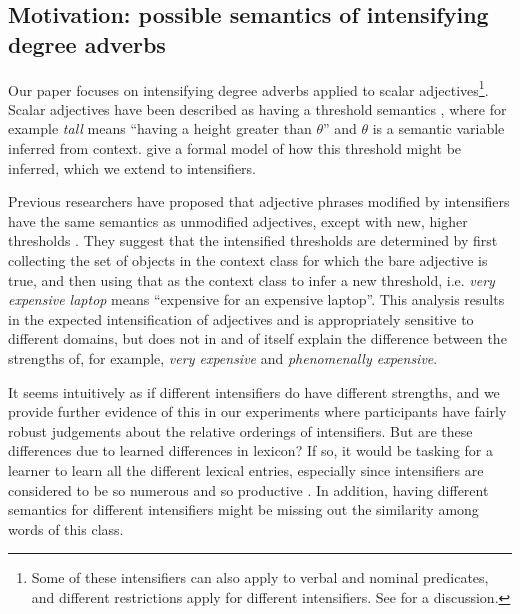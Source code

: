 \documentclass[10pt,letterpaper]{article}
\newcommand{\w}[1]{\emph{#1}}
\begin{document}
\subsection{Motivation: possible semantics of intensifying degree adverbs}

Our paper focuses on intensifying degree adverbs applied to scalar adjectives\footnote{Some of these intensifiers can also apply to verbal and nominal predicates, and different restrictions apply for different intensifiers. See \cite{bolinger} for a discussion.}. Scalar adjectives have been described as having a threshold semantics \cite{kennedy}, where for example \w{tall} means ``having a height greater than $\theta$'' and $\theta$ is a semantic variable inferred from context.
 give a formal model of how this threshold might be inferred, which we extend to intensifiers.

Previous researchers have proposed that adjective phrases modified by intensifiers have the same semantics as unmodified adjectives, except with new, higher thresholds \cite{klein, kennedyMcnally, wheeler}. They suggest that the intensified thresholds are determined by first collecting the set of objects in the context class for which the bare adjective is true, and then using that as the context class to infer a new threshold, i.e. \w{very expensive laptop} means ``expensive for an expensive laptop''.
This analysis results in the expected intensification of adjectives and is appropriately sensitive to different domains,
but does not in and of itself explain the difference between the strengths of, for example, \w{very expensive} and \w{phenomenally expensive}.

It seems intuitively as if different intensifiers do have different strengths, and we provide further evidence of this in our experiments where participants have fairly robust judgements about the relative orderings of intensifiers. But are these differences due to learned differences in lexicon?
If so, it would be tasking for a learner to learn all the different lexical entries, especially since intensifiers are considered to be so numerous and so productive
\cite{bolinger}.
In addition, having different semantics for different intensifiers might be missing out the similarity among words of this class.
\end{document}
